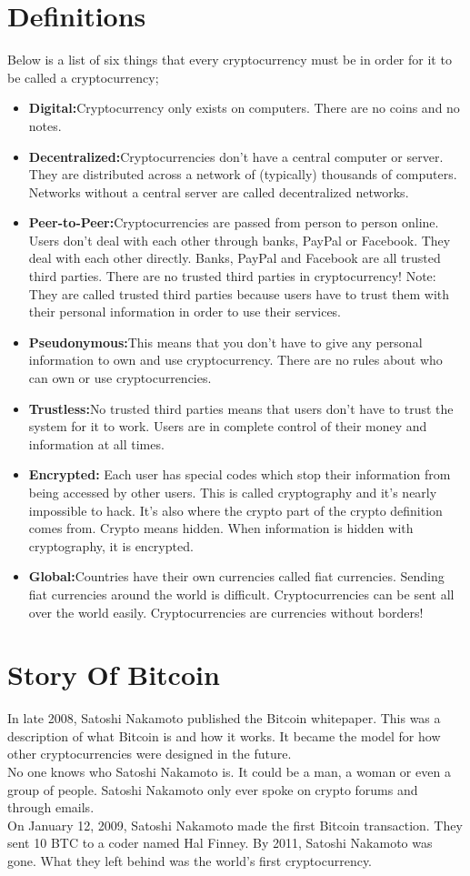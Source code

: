 \documentclass[9pt,twocolumn,twoside]{optica-suppl-materials}
\begin{document}
\section{Definitions}
Below is a list of six things that every cryptocurrency must be in
order for it to be called a cryptocurrency;
\begin{itemize}
    \item \textbf{Digital:}Cryptocurrency only exists on computers. There are no coins and no notes.
    \item \textbf{Decentralized:}Cryptocurrencies don’t have a central
computer or server. They are distributed across a network of
(typically) thousands of computers. Networks without a
central server are called decentralized networks.
     \item \textbf{Peer-to-Peer:}Cryptocurrencies are passed from person to
person online. Users don’t deal with each other through
banks, PayPal or Facebook. They deal with each other
directly. Banks, PayPal and Facebook are all trusted third
parties. There are no trusted third parties in cryptocurrency!
Note: They are called trusted third parties because users have
to trust them with their personal information in order to use
their services.
     \item \textbf{Pseudonymous:}This means that you don’t have to give any
personal information to own and use cryptocurrency. There
are no rules about who can own or use cryptocurrencies.
    \item \textbf{Trustless:}No trusted third parties means that users don’t
have to trust the system for it to work. Users are in complete
control of their money and information at all times.
    \item \textbf{Encrypted: }Each user has special codes which stop their
information from being accessed by other users. This is called
cryptography and it’s nearly impossible to hack. It’s also
where the crypto part of the crypto definition comes from.
Crypto means hidden. When information is hidden with
cryptography, it is encrypted.
    \item \textbf{Global:}Countries have their own currencies called fiat
currencies. Sending fiat currencies around the world is
difficult. Cryptocurrencies can be sent all over the world
easily. Cryptocurrencies are currencies without borders!
\end{itemize}

\section{Story Of Bitcoin}
In late 2008, Satoshi Nakamoto published the Bitcoin
whitepaper. This was a description of what Bitcoin is and how
it works. It became the model for how other cryptocurrencies
were designed in the future.\\
No one knows who Satoshi Nakamoto is. It could be a man, a
woman or even a group of people. Satoshi Nakamoto only
ever spoke on crypto forums and through emails.\\
On January 12, 2009, Satoshi Nakamoto made the first
Bitcoin transaction. They sent 10 BTC to a coder named Hal
Finney. By 2011, Satoshi Nakamoto was gone. What they left
behind was the world’s first cryptocurrency.
\end{document}

